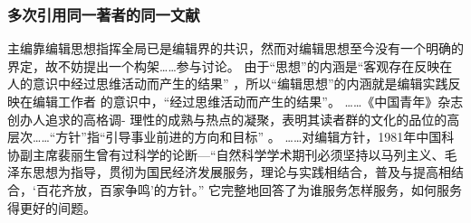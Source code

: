 \documentclass{article}
\begin{document}
\subsubsection{多次引用同一著者的同一文献}
\begin{refsection}
主编靠编辑思想指挥全局已是编辑界的共识\cite{张忠智1997-33-34}，然而对编辑思想至今没有一个明确的界定，故不妨提出一个构架……参与讨论。
由于“思想”的内涵是“客观存在反映在人的意识中经过思维活动而产生的结果”
，所以“编辑思想”的内涵就是编辑实践反映在编辑工作者
的意识中，“经过思维活动而产生的结果”。
……《中国青年》杂志创办人追求的高格调-
理性的成熟与热点的凝聚\cite{刘彻东1998-38-39}，表明其读者群的文化的品位的高层次……“方针”指“引导事业前进的方向和目标”
。
……对编辑方针，1981年中国科协副主席裴丽生曾有过科学的论断—“自然科学学术期刊必须坚持以马列主义、毛泽东思想为指导，贯彻为国民经济发展服务，理论与实践相结合，普及与提高相结合，‘百花齐放，百家争鸣’的方针。” \cite{裴丽生1981-2-10}它完整地回答了为谁服务怎样服务，如何服务得更好的间题。

\printbibliography[heading=subbibliography]
\end{refsection}
\end{document}
